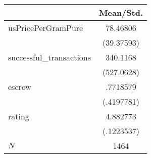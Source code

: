 {
\def\sym#1{\ifmmode^{#1}\else\(^{#1}\)\fi}
\begin{tabular}{l*{1}{c}}
\hline\hline
            &   Mean/Std.\\
\hline
usPricePerGramPure&    78.46806\\
            &  (39.37593)\\
successful\_transactions&    340.1168\\
            &  (527.0628)\\
escrow      &    .7718579\\
            &  (.4197781)\\
rating      &    4.882773\\
            &  (.1223537)\\
\hline
\(N\)       &        1464\\
\hline\hline
\end{tabular}
}
